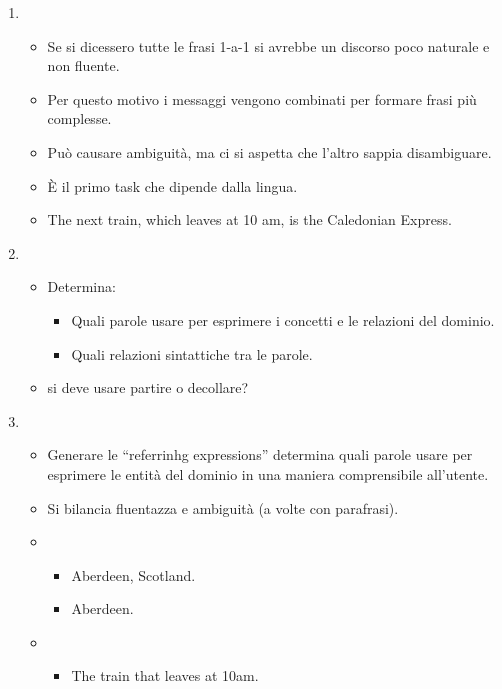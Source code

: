 \begin{enumerate}
\begin{itemize}
    \end{itemize}
  \item {}
    \begin{itemize}
      \item Se si dicessero tutte le frasi 1-a-1 si avrebbe un discorso poco naturale e non fluente. 
      \item Per questo motivo i messaggi vengono combinati per formare frasi più complesse. 
      \item Può causare ambiguità, ma ci si aspetta che l'altro sappia disambiguare.
      \item È il primo task che dipende dalla lingua.
      \item {} The next train, which leaves at 10 am, is the Caledonian Express.
    \end{itemize}
  \item {} 
    \begin{itemize}
      \item Determina: 
        \begin{itemize}
          \item Quali parole usare per esprimere i concetti e le relazioni del dominio. 
          \item Quali relazioni sintattiche tra le parole.
        \end{itemize}
      \item {} si deve usare partire o decollare?
    \end{itemize}
  \item {}
    \begin{itemize}
      \item Generare le “referrinhg expressions” determina quali parole usare per esprimere le entità del dominio in una maniera comprensibile all'utente. 
      \item Si bilancia fluentazza e ambiguità (a volte con parafrasi).
      \item {} 
        \begin{itemize}
          \item Aberdeen, Scotland. 
          \item Aberdeen.
        \end{itemize}
      \item {}
        \begin{itemize}
          \item The train that leaves at 10am. 

\end{itemize}
\end{itemize}
\end{enumerate}
